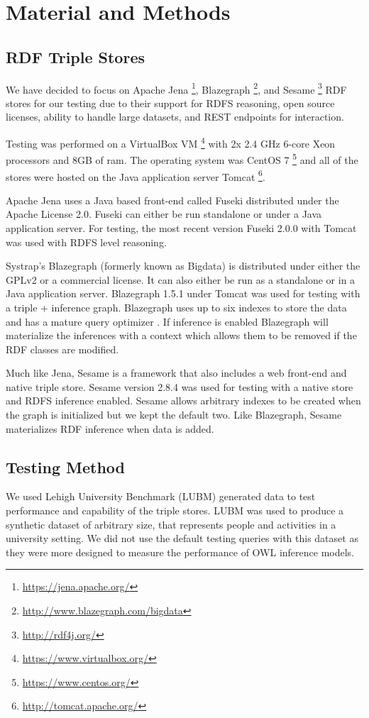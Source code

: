 \documentclass{llncs}
\begin{document}
\section{Material and Methods}
\subsection{RDF Triple Stores}

We have decided to focus on Apache Jena \footnote{\url{https://jena.apache.org/}}, Blazegraph \footnote{\url{http://www.blazegraph.com/bigdata}}, and Sesame \footnote{\url{http://rdf4j.org/}}  RDF stores for our testing due to their support for RDFS reasoning, open source licenses, ability to handle large datasets, and REST endpoints for interaction. \cite{Voigt2012}

Testing was performed on a VirtualBox VM \footnote{\url{https://www.virtualbox.org/}} with 2x 2.4 GHz 6-core Xeon processors and 8GB of ram.  The operating system was CentOS 7 \footnote{\url{https://www.centos.org/}} and all of the stores were hosted on the Java application server Tomcat \footnote{\url{http://tomcat.apache.org/}}.

Apache Jena uses a Java based front-end called Fuseki distributed under the Apache License 2.0.  Fuseki can either be run standalone or under a Java application server.  For testing, the most recent version Fuseki 2.0.0 with Tomcat was used with RDFS level reasoning.

Systrap's Blazegraph (formerly known as Bigdata) is distributed under either the GPLv2 or a commercial license.  It can also either be run as a standalone or in a Java application server.  Blazegraph 1.5.1 under Tomcat was used for testing with a triple + inference graph.  Blazegraph uses up to six indexes to store the data and has a mature query optimizer \cite{RDFDatabaseSystems}.  If inference is enabled Blazegraph will materialize the inferences with a context which allows them to be removed if the RDF classes are modified.

Much like Jena, Sesame is a framework that also includes a web front-end and native triple store.  Sesame version 2.8.4 was used for testing with a native store and RDFS inference enabled.  Sesame allows arbitrary indexes to be created when the graph is initialized but we kept the default two.  Like Blazegraph, Sesame materializes RDF inference when data is added.

\subsection{Testing Method}
We used Lehigh University Benchmark (LUBM) \cite{Guo2005} generated data to test performance and capability of the triple stores. LUBM was used to produce a synthetic dataset of arbitrary size, that represents people and activities in a university setting.  We did not use the default testing queries with this dataset as they were more designed to measure the performance of OWL inference models.
\end{document}
